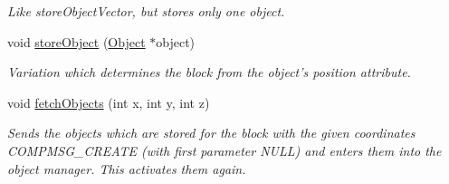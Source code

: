 \begin{DoxyCompactItemize}
\begin{DoxyCompactList}\small\item\em \-Like store\-Object\-Vector, but stores only one object. \end{DoxyCompactList}\item 
\hypertarget{classGameDataStorage_a316eac31d1f452bc8de9b683cfe6200a}{
void \hyperlink{classGameDataStorage_a316eac31d1f452bc8de9b683cfe6200a}{store\-Object} (\hyperlink{classObject}{\-Object} $\ast$object)}
\label{dc/d0b/classGameDataStorage_a316eac31d1f452bc8de9b683cfe6200a}

\begin{DoxyCompactList}\small\item\em \-Variation which determines the block from the object's position attribute. \end{DoxyCompactList}\item 
\hypertarget{classGameDataStorage_aae67a1ddd34592ce6ca7ad8dd7338986}{
void \hyperlink{classGameDataStorage_aae67a1ddd34592ce6ca7ad8dd7338986}{fetch\-Objects} (int x, int y, int z)}
\label{dc/d0b/classGameDataStorage_aae67a1ddd34592ce6ca7ad8dd7338986}

\begin{DoxyCompactList}\small\item\em \-Sends the objects which are stored for the block with the given coordinates \-C\-O\-M\-P\-M\-S\-G\-\_\-\-C\-R\-E\-A\-T\-E (with first parameter \-N\-U\-L\-L) and enters them into the object manager. \-This activates them again. \end{DoxyCompactList}\end{DoxyCompactItemize}
